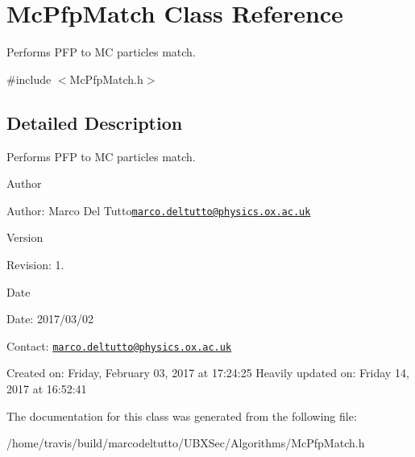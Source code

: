\hypertarget{classMcPfpMatch}{\section{Mc\-Pfp\-Match Class Reference}
\label{classMcPfpMatch}
}


Performs P\-F\-P to M\-C particles match.  




{\ttfamily \#include $<$Mc\-Pfp\-Match.\-h$>$}



\subsection{Detailed Description}
Performs P\-F\-P to M\-C particles match. 

\begin{DoxyAuthor}{Author}

\end{DoxyAuthor}
\begin{DoxyParagraph}{Author\-:}
Marco Del Tutto\href{mailto:marco.deltutto@physics.ox.ac.uk}{\tt marco.\-deltutto@physics.\-ox.\-ac.\-uk} 
\end{DoxyParagraph}


\begin{DoxyVersion}{Version}

\end{DoxyVersion}
\begin{DoxyParagraph}{Revision\-:}
1. 
\end{DoxyParagraph}


\begin{DoxyDate}{Date}

\end{DoxyDate}
\begin{DoxyParagraph}{Date\-:}
2017/03/02 
\end{DoxyParagraph}


Contact\-: \href{mailto:marco.deltutto@physics.ox.ac.uk}{\tt marco.\-deltutto@physics.\-ox.\-ac.\-uk}

Created on\-: Friday, February 03, 2017 at 17\-:24\-:25 Heavily updated on\-: Friday 14, 2017 at 16\-:52\-:41 

The documentation for this class was generated from the following file\-:\begin{DoxyCompactItemize}
\item 
/home/travis/build/marcodeltutto/\-U\-B\-X\-Sec/\-Algorithms/Mc\-Pfp\-Match.\-h\end{DoxyCompactItemize}
